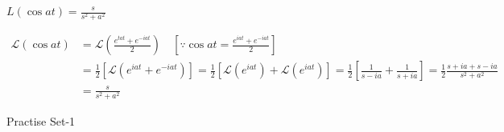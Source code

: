 \begin{exercise}
	$L(\cos a t)=\frac{s}{s^{2}+a^{2}}$
\end{exercise}
\begin{answer}
	\begin{align*}
	\mathcal{L}(\cos a t)&=\mathcal{L}\left(\frac{e^{t a t}+e^{-i a t}}{2}\right) \quad\left[\because \cos a t=\frac{e^{i a t}+e^{-i a t}}{2}\right]\\
	&=\frac{1}{2}\left[\mathcal{L}\left(e^{i a t}+e^{-i a t}\right)\right]=\frac{1}{2}\left[\mathcal{L}\left(e^{i a t}\right)+\mathcal{L}\left(e^{i a t}\right)\right]=\frac{1}{2}\left[\frac{1}{s-i a}+\frac{1}{s+i a}\right]=\frac{1}{2} \frac{s+i a+s-i a}{s^{2}+a^{2}}\\
	&=\frac{s}{s^{2}+a^{2}}
	\end{align*}
\end{answer}
\newpage
\begin{abox}
	Practise Set-1
\end{abox}

